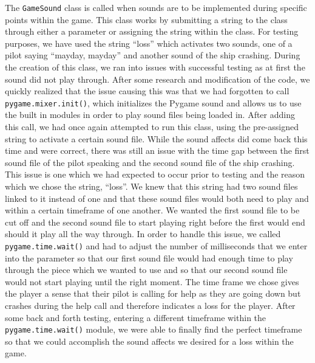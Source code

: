 The \texttt{GameSound} class is called when sounds are
to be implemented during specific points within the game. This class
works by submitting a string to the class through either a parameter
or assigning the string within the class. For testing purposes, we
have used the string “loss” which activates two sounds, one of a
pilot saying “mayday, mayday” and another sound of the ship
crashing.  During the creation of this class, we ran into issues
with successful testing as at first the sound did not play through.
After some research and modification of the code, we quickly
realized that the issue causing this was that we had forgotten to
call \texttt{pygame.mixer.init()}, which initializes the
Pygame sound and allows us to use the built in modules in order to
play sound files being loaded in. After adding this call, we had
once again attempted to run this class, using the pre-assigned
string to activate a certain sound file. While the sound affects did
come back this time and were correct, there was still an issue with
the time gap between the first sound file of the pilot speaking and
the second sound file of the ship crashing. This issue is one which
we had expected to occur prior to testing and the reason which we
chose the string, “loss”. We knew that this string had two sound
files linked to it instead of one and that these sound files would
both need to play and within a certain timeframe of one another.  We
wanted the first sound file to be cut off and the second sound file
to start playing right before the first would end should it play all
the way through. In order to handle this issue, we called
\texttt{pygame.time.wait()} and had to adjust the number
of milliseconds that we enter into the parameter so that our first
sound file would had enough time to play through the piece which we
wanted to use and so that our second sound file would not start
playing until the right moment. The time frame we chose gives the
player a sense that their pilot is calling for help as they are
going down but crashes during the help call and therefore indicates
a loss for the player. After some back and forth testing, entering a
different timeframe within the \texttt{pygame.time.wait()}
module, we were able to finally find the perfect timeframe so that
we could accomplish the sound affects we desired for a loss within
the game.
